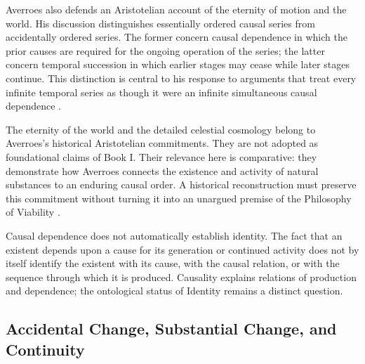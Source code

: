 \label{para:VS.B01.P01.C08.S15.SS12.P002}

Averroes also defends an Aristotelian account
of the eternity of motion and the world. His
discussion distinguishes essentially ordered
causal series from accidentally ordered series.
The former concern causal dependence in which
the prior causes are required for the ongoing
operation of the series; the latter concern
temporal succession in which earlier stages
may cease while later stages continue. This
distinction is central to his response to
arguments that treat every infinite temporal
series as though it were an infinite simultaneous
causal dependence
\citep{AverroesIncoherenceVanDenBergh1954,
AverroesMetaphysicsBookLambdaGenequand1984}.

\label{para:VS.B01.P01.C08.S15.SS12.P003}

The eternity of the world and the detailed
celestial cosmology belong to Averroes's
historical Aristotelian commitments. They
are not adopted as foundational claims of
Book I. Their relevance here is comparative:
they demonstrate how Averroes connects the
existence and activity of natural substances
to an enduring causal order. A historical
reconstruction must preserve this commitment
without turning it into an unargued premise
of the Philosophy of Viability
\citep{AverroesIncoherenceVanDenBergh1954,
BenAhmedPasnauIbnRushdSEP2025}.

\label{para:VS.B01.P01.C08.S15.SS12.P004}

Causal dependence does not automatically
establish identity. The fact that an existent
depends upon a cause for its generation or
continued activity does not by itself identify
the existent with its cause, with the causal
relation, or with the sequence through which
it is produced. Causality explains relations
of production and dependence; the ontological
status of Identity remains a distinct question.



\subsection{Accidental Change, Substantial Change, and Continuity}
\label{subsec:ch08_s15_ss13}

